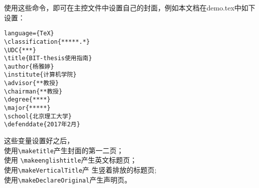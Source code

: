 使用这些命令，即可在主控文件中设置自己的封面，例如本文档在demo.tex中如下
设置：
\begin{lstlisting}language={TeX}
\classification{*****.*}
\UDC{***}
\title{BIT-thesis使用指南}
\author{杨雅婷}
\institute{计算机学院}
\advisor{**教授}
\chairman{**教授}
\degree{****}
\major{*****}
\school{北京理工大学}
\defenddate{2017年2月}
\end{lstlisting}

这些变量设置好之后，\\使用\verb+\maketitle+产生封面的第一二页；\\使用
\verb+\makeenglishtitle+产生英文标题页；\\使用\verb+\makeVerticalTitle+产
生竖着排放的标题页;\\使用\verb+\makeDeclareOriginal+产生声明页。
